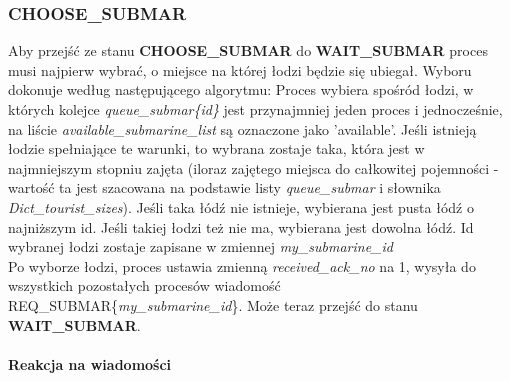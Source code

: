 \documentclass[a4paper]{article}
\begin{document}
\resetlinenumber[1]\linenumbers
\subsubsection{\textbf{CHOOSE\_SUBMAR}}
Aby przejść ze stanu \textbf{CHOOSE\_SUBMAR} do \textbf{WAIT\_SUBMAR} proces musi najpierw wybrać, o miejsce na której łodzi będzie się ubiegał. Wyboru dokonuje według następującego algorytmu:
Proces wybiera spośród łodzi, w których kolejce \textit{queue\_submar\{id\}} jest przynajmniej jeden proces i jednocześnie, na liście \textit{available\_submarine\_list} są oznaczone jako 'available'.
Jeśli istnieją łodzie spełniające te warunki, to wybrana zostaje taka, która jest w najmniejszym stopniu zajęta (iloraz zajętego miejsca do całkowitej pojemności - wartość ta jest szacowana na podstawie listy \textit{queue\_submar} i słownika \textit{Dict\_tourist\_sizes}). Jeśli taka łódź nie istnieje, wybierana jest
pusta łódź o najniższym id. Jeśli takiej łodzi też nie ma, wybierana jest dowolna łódź. Id wybranej łodzi zostaje zapisane w zmiennej \textit{my\_submarine\_id}\\
Po wyborze łodzi, proces ustawia zmienną \textit{received\_ack\_no} na 1, wysyła do wszystkich pozostałych procesów wiadomość REQ\_SUBMAR\{\textit{my\_submarine\_id}\}. Może teraz przejść do stanu \textbf{WAIT\_SUBMAR}.
\\
\\
\textbf{Reakcja na wiadomości}
\end{document}
